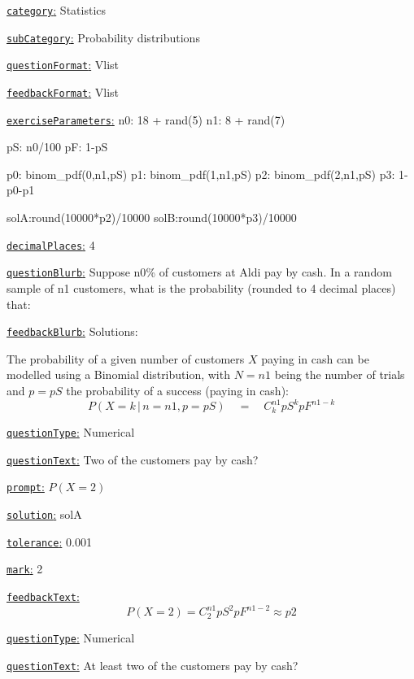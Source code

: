 \documentclass[preview]{standalone}
\newcommand \fieldname[1]{\underline{\texttt{#1}:}}
\begin{document}
\fieldname{category}  %
Statistics

\fieldname{subCategory} %
Probability distributions

\fieldname{questionFormat}
Vlist

\fieldname{feedbackFormat}
Vlist

\fieldname{exerciseParameters}
n0: 18 + rand(5)
n1: 8 + rand(7)

pS: n0/100
pF: 1-pS

p0: binom_pdf(0,n1,pS)
p1: binom_pdf(1,n1,pS)
p2: binom_pdf(2,n1,pS)
p3: 1-p0-p1

solA:round(10000*p2)/10000
solB:round(10000*p3)/10000

\fieldname{decimalPlaces}
4

\fieldname{questionBlurb}
Suppose {n0}\% of customers at Aldi pay by cash. In a random sample of {n1} customers, what is the probability (rounded to 4 decimal places) that:

\fieldname{feedbackBlurb}
Solutions:

The probability of a given number of customers $X$ paying in cash can be modelled using a Binomial distribution, with $N={n1}$ being the number of trials and $p={pS}$ the probability of a success (paying in cash):
\[
P(X=k \, | \, n={n1},p={pS}) \quad = \quad C^{{n1}}_k {pS}^k {pF}^{{n1}-k}
\]

\fieldname{questionType}
Numerical

\fieldname{questionText}
Two of the customers pay by cash?

\fieldname{prompt}
$P(X = 2)$

\fieldname{solution}
solA

\fieldname{tolerance}
0.001

\fieldname{mark}
2

\fieldname{feedbackText}
\[
P(X = 2)  = C^{{n1}}_2 {pS}^2 {pF}^{{n1}-2} \approx {p2}
\]

\fieldname{questionType}
Numerical

\fieldname{questionText}
At least two of the customers pay by cash?
\end{document}

